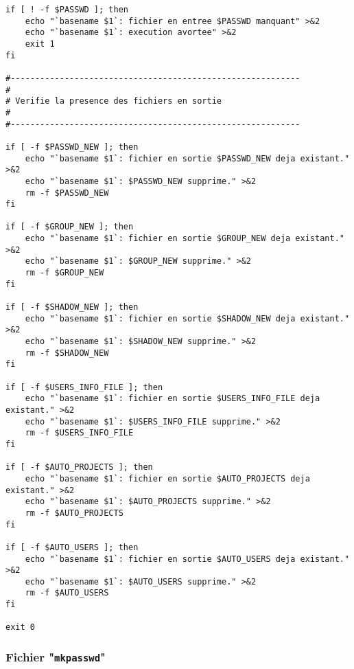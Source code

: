 \begin{verbatim}
if [ ! -f $PASSWD ]; then
    echo "`basename $1`: fichier en entree $PASSWD manquant" >&2
    echo "`basename $1`: execution avortee" >&2
    exit 1
fi

#-----------------------------------------------------------
#
# Verifie la presence des fichiers en sortie
#
#-----------------------------------------------------------

if [ -f $PASSWD_NEW ]; then
    echo "`basename $1`: fichier en sortie $PASSWD_NEW deja existant." >&2
    echo "`basename $1`: $PASSWD_NEW supprime." >&2
    rm -f $PASSWD_NEW
fi

if [ -f $GROUP_NEW ]; then
    echo "`basename $1`: fichier en sortie $GROUP_NEW deja existant." >&2
    echo "`basename $1`: $GROUP_NEW supprime." >&2
    rm -f $GROUP_NEW
fi

if [ -f $SHADOW_NEW ]; then
    echo "`basename $1`: fichier en sortie $SHADOW_NEW deja existant." >&2
    echo "`basename $1`: $SHADOW_NEW supprime." >&2
    rm -f $SHADOW_NEW
fi

if [ -f $USERS_INFO_FILE ]; then
    echo "`basename $1`: fichier en sortie $USERS_INFO_FILE deja existant." >&2
    echo "`basename $1`: $USERS_INFO_FILE supprime." >&2
    rm -f $USERS_INFO_FILE
fi

if [ -f $AUTO_PROJECTS ]; then
    echo "`basename $1`: fichier en sortie $AUTO_PROJECTS deja existant." >&2
    echo "`basename $1`: $AUTO_PROJECTS supprime." >&2
    rm -f $AUTO_PROJECTS
fi

if [ -f $AUTO_USERS ]; then
    echo "`basename $1`: fichier en sortie $AUTO_USERS deja existant." >&2
    echo "`basename $1`: $AUTO_USERS supprime." >&2
    rm -f $AUTO_USERS
fi

exit 0
\end{verbatim}

\subsubsection{\label{adv-programming-ex3-pgmpgm}Fichier "{\tt mkpasswd}"}

